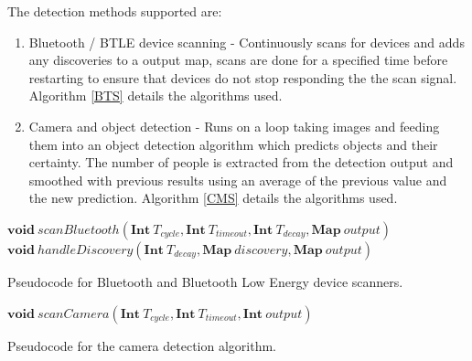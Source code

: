\documentclass{l4proj}
\begin{document}
The detection methods supported are:
\begin{enumerate}
  \item Bluetooth / BTLE device scanning -  Continuously scans for devices and adds any discoveries to a output map, scans are done for a specified time before restarting to ensure that devices do not stop responding the the scan signal. Algorithm \ref{BTS} details the algorithms used.
  \item Camera and object detection -  Runs on a loop taking images and feeding them into an object detection algorithm which predicts objects and their certainty. The number of people is extracted from the detection output and smoothed with previous results using an average of the previous value and the new prediction. Algorithm \ref{CMS} details the algorithms used.
\end{enumerate}

\begin{algorithm}
\DontPrintSemicolon
\nl $\textbf{void}~scanBluetooth(\textbf{Int}~T_{cycle}, \textbf{Int}~T_{timeout}, \textbf{Int}~T_{decay}, \textbf{Map}~output)$ \;
\nl {}
\;
\nl $\textbf{void}~handleDiscovery(\textbf{Int}~T_{decay}, \textbf{Map}~discovery, \textbf{Map}~output)$ \;
\nl {}
\;
\caption{Pseudocode for Bluetooth and Bluetooth Low Energy device scanners.}
\label{BTS}
\end{algorithm}

\begin{algorithm}
\DontPrintSemicolon
\nl $\textbf{void}~scanCamera(\textbf{Int}~T_{cycle}, \textbf{Int}~T_{timeout}, \textbf{Int}~output)$ \;
\nl {}
\;
\caption{Pseudocode for the camera detection algorithm.}
\label{CMS}
\end{algorithm}
\end{document}
